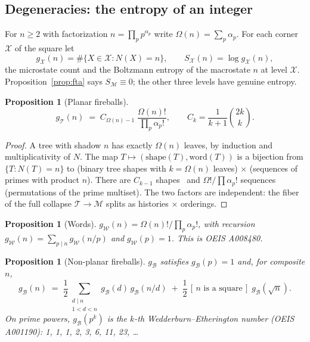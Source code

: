 \documentclass[11pt]{article}
\newcommand{\cT}{\mathcal{T}}   %
\newcommand{\cW}{\mathcal{W}}   %
\newcommand{\cB}{\mathcal{B}}   %
\newcommand{\cM}{\mathcal{M}}   %
\numberwithin{equation}{section}
\theoremstyle{plain}
\newtheorem{proposition}[theorem]{Proposition}
\theoremstyle{definition}
\theoremstyle{remark}
\begin{document}
\subsection{Degeneracies: the entropy of an integer}

For $n \ge 2$ with factorization $n = \prod_p p^{\alpha_p}$ write
$\Omega(n) = \sum_p \alpha_p$. For each corner $\mathcal{X}$ of the square let
\[
g_{\mathcal X}(n) = \#\{X \in \mathcal{X} : N(X) = n\},
\qquad
S_{\mathcal X}(n) = \log g_{\mathcal X}(n),
\]
the microstate count and the Boltzmann entropy of the macrostate $n$ at level
$\mathcal X$. Proposition~\ref{prop:fta} says $S_\cM \equiv 0$; the other three levels
have genuine entropy.

\begin{proposition}[Planar fireballs]\label{prop:gT}
\[
g_\cT(n) \;=\; C_{\Omega(n)-1}\;\frac{\Omega(n)!}{\prod_p \alpha_p!},
\qquad C_k = \frac{1}{k+1}\binom{2k}{k}.
\]
\end{proposition}

\begin{proof}
A tree with shadow $n$ has exactly $\Omega(n)$ leaves, by induction and
multiplicativity of $N$. The map $T \mapsto (\text{shape}(T), \mathrm{word}(T))$ is a
bijection from $\{T : N(T)=n\}$ to (binary tree shapes with $k=\Omega(n)$ leaves)
$\times$ (sequences of primes with product $n$). There are $C_{k-1}$
shapes~\cite{stanley} and $\Omega!/\prod \alpha_p!$ sequences (permutations of the
prime multiset). The two factors are independent: the fiber of the full collapse
$\cT \to \cM$ splits as histories $\times$ orderings.
\end{proof}

\begin{proposition}[Words]\label{prop:gW}
$g_\cW(n) = \Omega(n)!/\prod_p \alpha_p!$, with recursion
$g_\cW(n) = \sum_{p \mid n} g_\cW(n/p)$ and $g_\cW(p)=1$. This is OEIS A008480.
\end{proposition}

\begin{proposition}[Non-planar fireballs]\label{prop:gB}
$g_\cB$ satisfies $g_\cB(p) = 1$ and, for composite $n$,
\[
g_\cB(n) \;=\; \frac12 \sum_{\substack{d \mid n \\ 1<d<n}} g_\cB(d)\, g_\cB(n/d)
\;+\; \frac12\,[\,n \text{ is a square}\,]\; g_\cB(\sqrt n).
\]
On prime powers, $g_\cB(p^k)$ is the $k$-th Wedderburn--Etherington number
(OEIS A001190): 1, 1, 1, 2, 3, 6, 11, 23, \dots
\end{proposition}
\end{document}
